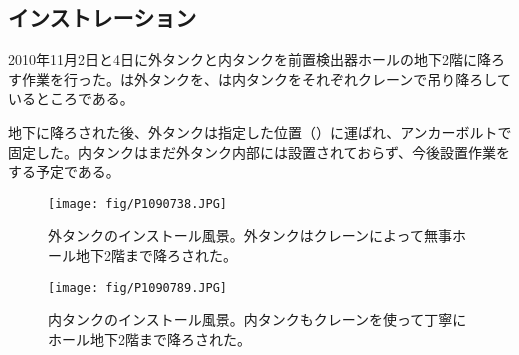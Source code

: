 \subsection{インストレーション}
2010年11月2日と4日に外タンクと内タンクを前置検出器ホールの地下2階に降ろす作業を行った。は外タンクを、は内タンクをそれぞれクレーンで吊り降ろしているところである。

地下に降ろされた後、外タンクは指定した位置（）に運ばれ、アンカーボルトで固定した。内タンクはまだ外タンク内部には設置されておらず、今後設置作業をする予定である。

\begin{figure}[htbp]
\begin{minipage}{0.47\textwidth}
\centering
\texttt{[image: fig/P1090738.JPG]}
\caption[外タンクインストール風景]{外タンクのインストール風景。外タンクはクレーンによって無事ホール地下2階まで降ろされた。}
\label{InstallOuterTank}
\end{minipage}
\hfil
\begin{minipage}{0.47\textwidth}
\centering
\texttt{[image: fig/P1090789.JPG]}
\caption[内タンクインストール風景]{内タンクのインストール風景。内タンクもクレーンを使って丁寧にホール地下2階まで降ろされた。}
\label{InstallInnerTank}
\end{minipage}
\end{figure}




